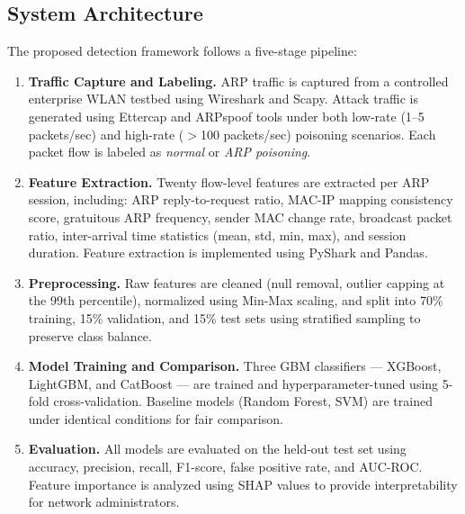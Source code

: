 \documentclass[12pt,a4paper]{article}
\begin{document}
\subsection{System Architecture}

The proposed detection framework follows a five-stage pipeline:

\begin{enumerate}[label=\textbf{Stage~\arabic*:}, leftmargin=*, itemsep=4pt]
    \item \textbf{Traffic Capture and Labeling.}
          ARP traffic is captured from a controlled enterprise WLAN testbed using
          Wireshark and Scapy. Attack traffic is generated using Ettercap and
          ARPspoof tools under both low-rate (1--5 packets/sec) and high-rate
          ($>$100 packets/sec) poisoning scenarios. Each packet flow is labeled
          as \textit{normal} or \textit{ARP poisoning}.

    \item \textbf{Feature Extraction.}
          Twenty flow-level features are extracted per ARP session, including:
          ARP reply-to-request ratio, MAC-IP mapping consistency score,
          gratuitous ARP frequency, sender MAC change rate, broadcast packet
          ratio, inter-arrival time statistics (mean, std, min, max), and
          session duration. Feature extraction is implemented using PyShark
          and Pandas.

    \item \textbf{Preprocessing.}
          Raw features are cleaned (null removal, outlier capping at the 99th
          percentile), normalized using Min-Max scaling, and split into 70\%
          training, 15\% validation, and 15\% test sets using stratified
          sampling to preserve class balance.

    \item \textbf{Model Training and Comparison.}
          Three GBM classifiers --- XGBoost, LightGBM, and CatBoost --- are
          trained and hyperparameter-tuned using 5-fold cross-validation.
          Baseline models (Random Forest, SVM) are trained under identical
          conditions for fair comparison.

    \item \textbf{Evaluation.}
          All models are evaluated on the held-out test set using accuracy,
          precision, recall, F1-score, false positive rate, and AUC-ROC.
          Feature importance is analyzed using SHAP values to provide
          interpretability for network administrators.
\end{enumerate}
\end{document}
